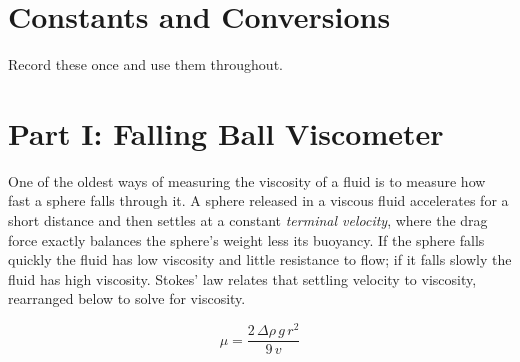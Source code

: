 \documentclass[11pt,a4paper]{article}
\begin{document}
\section{Constants and Conversions}
Record these once and use them throughout.

\smallskip
{}

\section{Part I: Falling Ball Viscometer}
One of the oldest ways of measuring the viscosity of a fluid is to measure how fast a sphere
falls through it. A sphere released in a viscous fluid accelerates for a short distance and then
settles at a constant \emph{terminal velocity}, where the drag force exactly balances the
sphere's weight less its buoyancy. If the sphere falls quickly the fluid has low viscosity and
little resistance to flow; if it falls slowly the fluid has high viscosity. Stokes' law relates
that settling velocity to viscosity, rearranged below to solve for viscosity.

\begin{equation}
  \mu = \frac{2\,\Delta\rho\,g\,r^{2}}{9\,v}
\end{equation}
\end{document}
